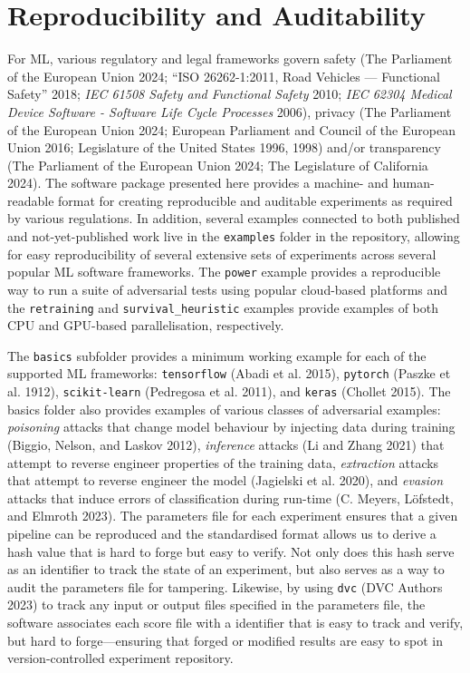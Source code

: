 \documentclass[
]{article}
\begin{document}
\hypertarget{reproducibility-and-auditability}{%
\section{Reproducibility and
Auditability}\label{reproducibility-and-auditability}}

For ML, various regulatory and legal frameworks govern safety (The
Parliament of the European Union 2024; {``{ISO} 26262-1:2011, Road
Vehicles --- Functional Safety''} 2018; \emph{IEC 61508 Safety and
Functional Safety} 2010; \emph{IEC 62304 Medical Device Software -
Software Life Cycle Processes} 2006), privacy (The Parliament of the
European Union 2024; European Parliament and Council of the European
Union 2016; Legislature of the United States 1996, 1998) and/or
transparency (The Parliament of the European Union 2024; The Legislature
of California 2024). The software package presented here provides a
machine- and human-readable format for creating reproducible and
auditable experiments as required by various regulations. In addition,
several examples connected to both published and not-yet-published work
live in the \texttt{examples} folder in the repository, allowing for
easy reproducibility of several extensive sets of experiments across
several popular ML software frameworks. The \texttt{power} example
provides a reproducible way to run a suite of adversarial tests using
popular cloud-based platforms and the \texttt{retraining} and
\texttt{survival\_heuristic} examples provide examples of both CPU and
GPU-based parallelisation, respectively.

The \texttt{basics} subfolder provides a minimum working example for
each of the supported ML frameworks: \texttt{tensorflow} (Abadi et al.
2015), \texttt{pytorch} (Paszke et al. 1912), \texttt{scikit-learn}
(Pedregosa et al. 2011), and \texttt{keras} (Chollet 2015). The basics
folder also provides examples of various classes of adversarial
examples: \emph{poisoning} attacks that change model behaviour by
injecting data during training (Biggio, Nelson, and Laskov 2012),
\emph{inference} attacks (Li and Zhang 2021) that attempt to reverse
engineer properties of the training data, \emph{extraction} attacks that
attempt to reverse engineer the model (Jagielski et al. 2020), and
\emph{evasion} attacks that induce errors of classification during
run-time (C. Meyers, Löfstedt, and Elmroth 2023). The parameters file
for each experiment ensures that a given pipeline can be reproduced and
the standardised format allows us to derive a hash value that is hard to
forge but easy to verify. Not only does this hash serve as an identifier
to track the state of an experiment, but also serves as a way to audit
the parameters file for tampering. Likewise, by using \texttt{dvc} (DVC
Authors 2023) to track any input or output files specified in the
parameters file, the software associates each score file with a
identifier that is easy to track and verify, but hard to
forge---ensuring that forged or modified results are easy to spot in
version-controlled experiment repository.
\end{document}
